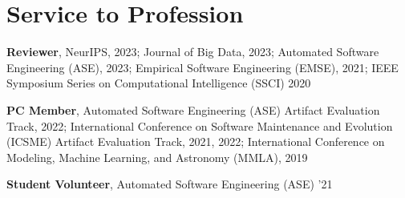 \section{Service to Profession}
 \resumeSubHeadingListStart
    \item
      {\textbf{Reviewer}, NeurIPS, 2023; Journal of Big Data, 2023; Automated Software Engineering (ASE), 2023; Empirical Software Engineering (EMSE), 2021; IEEE Symposium Series on Computational Intelligence (SSCI) 2020}
    \item
      {\textbf{PC Member}, Automated Software Engineering (ASE) Artifact Evaluation Track, 2022; International Conference on Software Maintenance and Evolution (ICSME) Artifact Evaluation Track, 2021, 2022; International Conference on Modeling, Machine Learning, and Astronomy (MMLA), 2019}
    \item
      {\textbf{Student Volunteer}, Automated Software Engineering (ASE) '21}
 \resumeSubHeadingListEnd